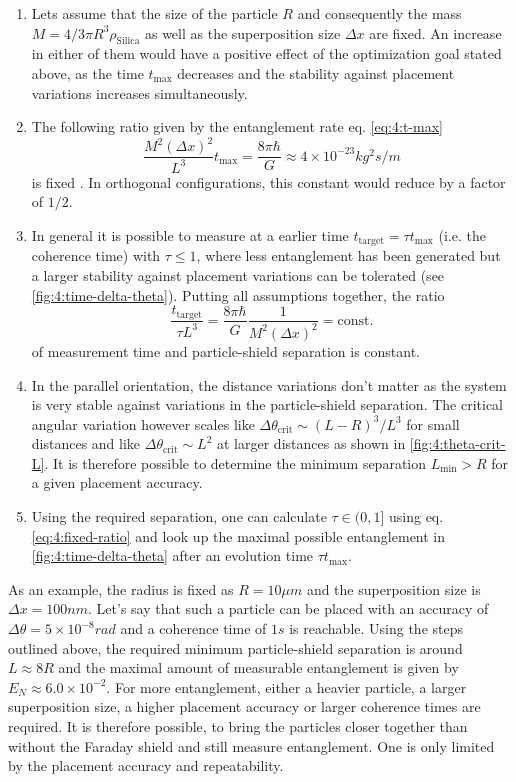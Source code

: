 \begin{enumerate}
  \item Lets assume that the size of the particle $R$ and consequently the mass $M=4/3 \pi R^3 \rho_\mathrm{Silica}$ as well as the superposition size $\Delta x$ are fixed. An increase in either of them would have a positive effect of the optimization goal stated above, as the time $t_\mathrm{max}$ decreases and the stability against placement variations increases simultaneously.
  \item The following ratio given by the entanglement rate eq. \eqref{eq:4:t-max}
  \begin{equation}
    \frac{M^2 (\Delta x)^2}{L^3}t_\mathrm{max} = \frac{8 \pi \hbar}{G} \approx 4 \times 10^{-23} \si{kg^2 s/m}
  \end{equation} 
  is fixed \cite{Aspelmeyer_2024}. In orthogonal configurations, this constant would reduce by a factor of $1/2$.
  \item In general it is possible to measure at a earlier time $t_\mathrm{target} = \tau t_\mathrm{max}$ (i.e. the coherence time) with $\tau \leq 1$, where less entanglement has been generated but a larger stability against placement variations can be tolerated (see \cref{fig:4:time-delta-theta}). Putting all assumptions together, the ratio
  \begin{equation}\label{eq:4:fixed-ratio}
    \frac{t_\mathrm{target}}{\tau L^3} = \frac{8\pi \hbar}{G} \frac{1}{M^2 (\Delta x)^2} = \mathrm{const.}
  \end{equation}
  of measurement time and particle-shield separation is constant.
  \item In the parallel orientation, the distance variations don't matter as the system is very stable against variations in the particle-shield separation. The critical angular variation however scales like $\Delta \theta_\mathrm{crit} \sim (L-R)^3/L^3$ for small distances and like $\Delta \theta_\mathrm{crit} \sim L^2$ at larger distances as shown in \cref{fig:4:theta-crit-L}. It is therefore possible to determine the minimum separation $L_\mathrm{min} > R$ for a given placement accuracy.
  \item Using the required separation, one can calculate $\tau \in (0, 1]$ using eq. \eqref{eq:4:fixed-ratio} and look up the maximal possible entanglement in \cref{fig:4:time-delta-theta} after an evolution time $\tau t_\mathrm{max}$.
\end{enumerate}
As an example, the radius is fixed as $R=10\si{\mu m}$ and the superposition size is $\Delta x = 100\si{nm}$. Let's say that such a particle can be placed with an accuracy of $\Delta \theta = 5 \times 10^{-8} \si{rad}$ and a coherence time of $1\si{s}$ is reachable. 
Using the steps outlined above, the required minimum particle-shield separation is around $L\approx 8R$ and the maximal amount of measurable entanglement is given by $E_N \approx 6.0\times 10^{-2}$.
For more entanglement, either a heavier particle, a larger superposition size, a higher placement accuracy or larger coherence times are required. 
It is therefore possible, to bring the particles closer together than without the Faraday shield and still measure entanglement.
One is only limited by the placement accuracy and repeatability.